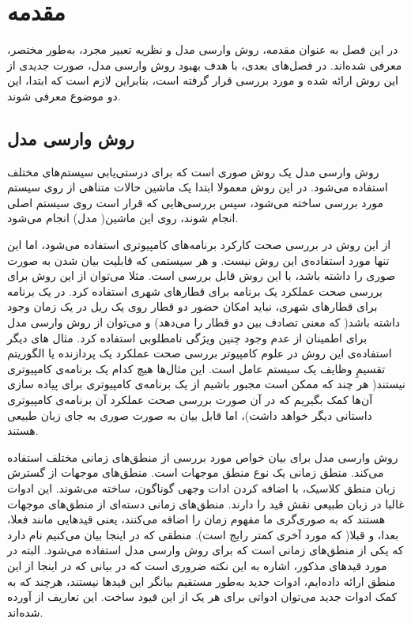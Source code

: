\pagestyle{plain}
\setcounter{page}{1}

\chapter{مقدمه}

در این فصل به عنوان مقدمه، روش وارسی مدل و نظریه تعبیر مجرد، به‌طور مختصر، معرفی شده‌اند. در فصل‌های بعدی، با هدف بهبود روش وارسی مدل، صورت جدیدی از این روش ارائه شده و مورد بررسی قرار گرفته است، بنابراین لازم است که ابتدا، این دو موضوع معرفی شوند.

\section{روش وارسی مدل}

روش وارسی مدل یک روش صوری است که برای درستی‌یابی سیستم‌های مختلف استفاده می‌شود. در این روش معمولا ابتدا یک ماشین حالات متناهی از روی سیستم مورد بررسی ساخته می‌شود، سپس بررسی‌هایی که قرار است روی سیستم اصلی انجام شوند، روی این ماشین( مدل) انجام می‌شود. 

از این روش در بررسی صحت کارکرد برنامه‌های کامپیوتری استفاده می‌شود، اما این تنها مورد استفاده‌ی این روش نیست. و هر سیستمی که قابلیت بیان شدن به صورت صوری را داشته باشد، با این روش قابل بررسی است. مثلا می‌توان از این روش برای بررسی صحت عملکرد یک برنامه برای قطارهای شهری استفاده کرد. در یک برنامه‌ برای قطارهای شهری، نباید امکان حضور دو قطار روی یک ریل در یک زمان وجود داشته باشد( که معنی تصادف بین دو قطار را می‌دهد) و می‌توان از روش وارسی مدل برای اطمینان از عدم وجود چنین ویژگی نامطلوبی استفاده کرد. مثال های دیگر استفاده‌ی این روش در علوم کامپیوتر بررسی صحت عملکرد یک پردازنده یا الگوریتم تقسیمِ وظایف یک سیستم عامل است. این مثال‌ها هیچ کدام یک برنامه‌ی کامپیوتری نیستند( هر چند که ممکن است مجبور باشیم از یک برنامه‌ی کامپیوتری برای پیاده سازی آن‌ها کمک بگیریم که در آن صورت بررسی صحت عملکرد آن برنامه‌ی کامپیوتری داستانی دیگر خواهد داشت)، اما قابل بیان به صورت صوری به جای زبان طبیعی هستند.

روش وارسی مدل برای بیان خواص مورد بررسی از منطق‌های زمانی مختلف استفاده می‌کند. منطق زمانی یک نوع منطق موجهات است. منطق‌های موجهات از گسترش زبان منطق کلاسیک، با اضافه کردن ادات وجهی گوناگون، ساخته می‌شوند. این ادوات غالبا در زبان طبیعی نقش قید را دارند. منطق‌های زمانی دسته‌ای از منطق‌های موجهات هستند که به صوری‌گری ما مفهوم زمان را اضافه می‌کنند، یعنی قیدهایی مانند فعلا، بعدا، و قبلا( که مورد آخری کمتر رایج است). منطقی که در اینجا بیان می‌کنیم  نام دارد که یکی از منطق‌های زمانی است که برای روش وارسی مدل استفاده می‌شود. البته در مورد قیدهای مذکور، اشاره به این نکته ضروری است که در بیانی که در اینجا از این منطق ارائه داده‌ایم، ادوات جدید به‌طور مستقیم بیانگر این قید‌ها نیستند، هرچند که به کمک ادوات جدید می‌توان ادواتی برای هر یک از این قیود ساخت.
این تعاریف از \cite{buchi} آورده شده‌اند.

